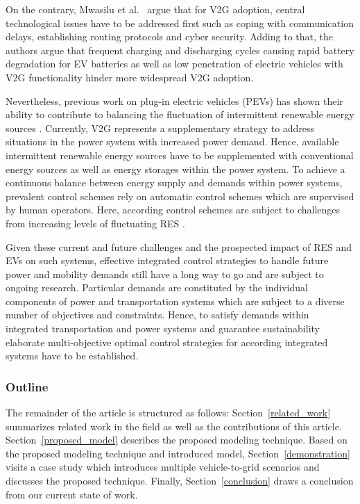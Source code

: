 On the contrary, Mwasilu et al.~\cite{mwasilu2014electric} argue that for V2G adoption, central technological issues have to be addressed first such as coping with communication delays, establishing routing protocols and cyber security. Adding to that, the authors argue that frequent charging and discharging cycles causing rapid battery degradation for EV batteries as well as low penetration of electric vehicles with V2G functionality hinder more widespread V2G adoption.

Nevertheless, previous work on plug-in electric vehicles (PEVs) has shown their ability to contribute to balancing the fluctuation of intermittent renewable energy sources \cite{dallinger2012grid}. Currently, V2G represents a supplementary strategy to address situations in the power system with increased power demand. Hence, available intermittent renewable energy sources have to be supplemented with conventional energy sources as well as energy storages within the power system. To achieve a continuous balance between energy supply and demands within power systems, prevalent control schemes rely on automatic control schemes which are supervised by human operators. Here, according control schemes are subject to challenges from increasing levels of fluctuating RES \cite{heussen2012unified}.

Given these current and future challenges and the prospected impact of RES and EVs on such systems, effective integrated control strategies to handle future power and mobility demands still have a long way to go and are subject to ongoing research. Particular demands are constituted by the individual components of power and transportation systems which are subject to a diverse number of objectives and constraints. Hence, to satisfy demands within integrated transportation and power systems and guarantee sustainability elaborate multi-objective optimal control strategies for according integrated systems have to be established.

\subsubsection*{Outline}

The remainder of the article is structured as follows: Section~\ref{related_work} summarizes related work in the field as well as the contributions of this article. Section~\ref{proposed_model} describes the proposed modeling technique. Based on the proposed modeling technique and introduced model, Section~\ref{demonstration} visits a case study which introduces multiple vehicle-to-grid scenarios and discusses the proposed technique. Finally, Section~\ref{conclusion} draws a conclusion from our current state of work.